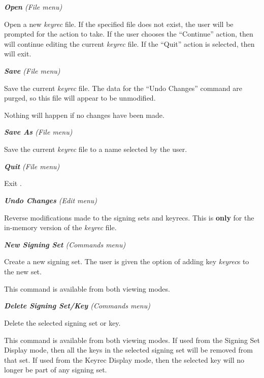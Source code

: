 \begin{description}

\item {\it {\bf Open} (File menu)}\verb" "

Open a new {\it keyrec} file.  If the specified file does not exist, the user
will be prompted for the action to take.  If the user chooses the ``Continue''
action, then  will continue editing the current {\it
keyrec} file.  If the ``Quit'' action is selected, then 
will exit.

\item {\it {\bf Save} (File menu)}\verb" "

Save the current {\it keyrec} file.  The data for the ``Undo Changes'' command
are purged, so this file will appear to be unmodified.

Nothing will happen if no changes have been made.

\item {\it {\bf Save As} (File menu)}\verb" "

Save the current {\it keyrec} file to a name selected by the user.

\item {\it {\bf Quit} (File menu)}\verb" "

Exit .

\item {\it {\bf Undo Changes} (Edit menu)}\verb" "

Reverse modifications made to the signing sets and keyrecs.  This is {\bf only}
for the in-memory version of the {\it keyrec} file.

\item {\it {\bf New Signing Set} (Commands menu)}\verb" "

Create a new signing set.   The user is given the option of adding key
{\it keyrec}s to the new set.

This command is available from both viewing modes.

\item {\it {\bf Delete Signing Set/Key} (Commands menu)}\verb" "

Delete the selected signing set or key.

This command is available from both viewing modes.  If used from the Signing
Set Display mode, then all the keys in the selected signing set will be
removed from that set.  If used from the Keyrec Display mode, then the
selected key will no longer be part of any signing set.


\end{description}

